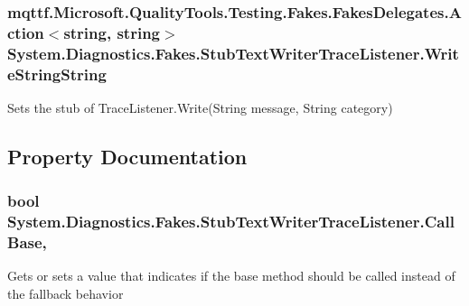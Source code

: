 \hypertarget{class_system_1_1_diagnostics_1_1_fakes_1_1_stub_text_writer_trace_listener_aed73d63f12e22e4c4925393649f9fb45}{
\subsubsection[{Write\-String\-String}]{\setlength{\rightskip}{0pt plus 5cm}mqttf.\-Microsoft.\-Quality\-Tools.\-Testing.\-Fakes.\-Fakes\-Delegates.\-Action$<$string, string$>$ System.\-Diagnostics.\-Fakes.\-Stub\-Text\-Writer\-Trace\-Listener.\-Write\-String\-String}}\label{class_system_1_1_diagnostics_1_1_fakes_1_1_stub_text_writer_trace_listener_aed73d63f12e22e4c4925393649f9fb45}


Sets the stub of Trace\-Listener.\-Write(\-String message, String category)



\subsection{Property Documentation}
\hypertarget{class_system_1_1_diagnostics_1_1_fakes_1_1_stub_text_writer_trace_listener_af2a399712395f973b7b5bc56d8c70503}{
\subsubsection[{Call\-Base}]{\setlength{\rightskip}{0pt plus 5cm}bool System.\-Diagnostics.\-Fakes.\-Stub\-Text\-Writer\-Trace\-Listener.\-Call\-Base\hspace{0.3cm}{\ttfamily [get]}, {\ttfamily [set]}}}\label{class_system_1_1_diagnostics_1_1_fakes_1_1_stub_text_writer_trace_listener_af2a399712395f973b7b5bc56d8c70503}


Gets or sets a value that indicates if the base method should be called instead of the fallback behavior


